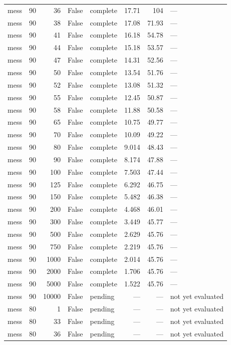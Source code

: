 \begin{tabular}{lrrrlrrl}
mess & 90 & 36 & False & complete & 17.71 & 104 & — \\
mess & 90 & 38 & False & complete & 17.08 & 71.93 & — \\
mess & 90 & 41 & False & complete & 16.18 & 54.78 & — \\
mess & 90 & 44 & False & complete & 15.18 & 53.57 & — \\
mess & 90 & 47 & False & complete & 14.31 & 52.56 & — \\
mess & 90 & 50 & False & complete & 13.54 & 51.76 & — \\
mess & 90 & 52 & False & complete & 13.08 & 51.32 & — \\
mess & 90 & 55 & False & complete & 12.45 & 50.87 & — \\
mess & 90 & 58 & False & complete & 11.88 & 50.58 & — \\
mess & 90 & 65 & False & complete & 10.75 & 49.77 & — \\
mess & 90 & 70 & False & complete & 10.09 & 49.22 & — \\
mess & 90 & 80 & False & complete & 9.014 & 48.43 & — \\
mess & 90 & 90 & False & complete & 8.174 & 47.88 & — \\
mess & 90 & 100 & False & complete & 7.503 & 47.44 & — \\
mess & 90 & 125 & False & complete & 6.292 & 46.75 & — \\
mess & 90 & 150 & False & complete & 5.482 & 46.38 & — \\
mess & 90 & 200 & False & complete & 4.468 & 46.01 & — \\
mess & 90 & 300 & False & complete & 3.449 & 45.77 & — \\
mess & 90 & 500 & False & complete & 2.629 & 45.76 & — \\
mess & 90 & 750 & False & complete & 2.219 & 45.76 & — \\
mess & 90 & 1000 & False & complete & 2.014 & 45.76 & — \\
mess & 90 & 2000 & False & complete & 1.706 & 45.76 & — \\
mess & 90 & 5000 & False & complete & 1.522 & 45.76 & — \\
mess & 90 & 10000 & False & pending & — & — & not yet evaluated \\
mess & 80 & 1 & False & pending & — & — & not yet evaluated \\
mess & 80 & 33 & False & pending & — & — & not yet evaluated \\
mess & 80 & 36 & False & pending & — & — & not yet evaluated \\

\end{tabular}

